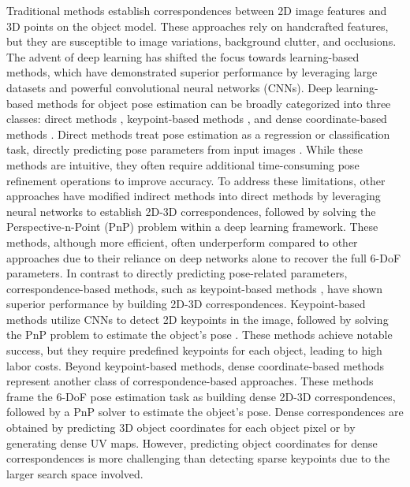 Traditional methods establish correspondences between 2D image features and 3D points on the object model. These approaches rely on handcrafted features, but they are susceptible to image variations, background clutter, and occlusions. The advent of deep learning has shifted the focus towards learning-based methods, which have demonstrated superior performance by leveraging large datasets and powerful convolutional neural networks (CNNs). Deep learning-based methods for object pose estimation can be broadly categorized into three classes: direct methods \cite{xiang2017posecnn, kehl2017ssd, trabelsi2021pose, wang2021gdr}, keypoint-based methods \cite{rad2017bb8, tekin2018real, oberweger2018making, peng2019pvnet}, and dense coordinate-based methods \cite{li2019cdpn, park2019pix2pose, zakharov2019dpod}. Direct methods treat pose estimation as a regression or classification task, directly predicting pose parameters from input images \cite{xiang2017posecnn, kehl2017ssd, trabelsi2021pose}. While these methods are intuitive, they often require additional time-consuming pose refinement operations to improve accuracy. To address these limitations, other approaches \cite{hu2020single, chen2020end, wang2021gdr} have modified indirect methods into direct methods by leveraging neural networks to establish 2D-3D correspondences, followed by solving the Perspective-n-Point (PnP) problem \cite{lepetit2009ep} within a deep learning framework. These methods, although more efficient, often underperform compared to other approaches due to their reliance on deep networks alone to recover the full 6-DoF parameters. In contrast to directly predicting pose-related parameters, correspondence-based methods, such as keypoint-based methods \cite{rad2017bb8, tekin2018real, oberweger2018making, peng2019pvnet}, have shown superior performance by building 2D-3D correspondences. Keypoint-based methods utilize CNNs to detect 2D keypoints in the image, followed by solving the PnP problem to estimate the object's pose \cite{lepetit2009ep}. These methods achieve notable success, but they require predefined keypoints for each object, leading to high labor costs. Beyond keypoint-based methods, dense coordinate-based methods \cite{li2019cdpn, park2019pix2pose, zakharov2019dpod} represent another class of correspondence-based approaches. These methods frame the 6-DoF pose estimation task as building dense 2D-3D correspondences, followed by a PnP solver to estimate the object's pose. Dense correspondences are obtained by predicting 3D object coordinates for each object pixel or by generating dense UV maps. However, predicting object coordinates for dense correspondences is more challenging than detecting sparse keypoints due to the larger search space involved.

